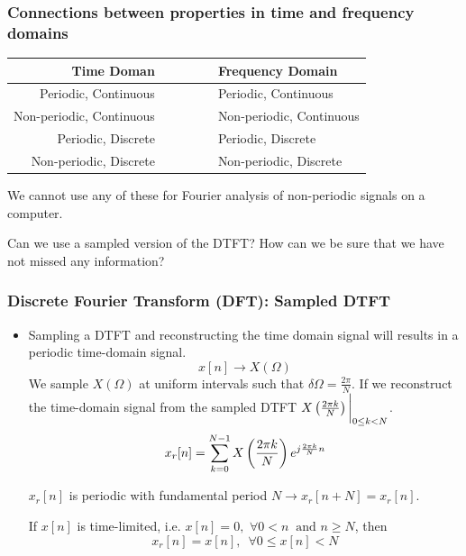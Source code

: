 \documentclass[aspectratio=169]{beamer}
\let\olditem\item
\renewcommand{\item}{\setlength{\itemsep}{\fill}\olditem}
\def\lp{\ensuremath\left(}
\def\rp{\ensuremath\right)}
\begin{document}
\begin{frame}[t]
  \frametitle{Connections between properties in time and frequency domains}

  \begin{table}[]
  \begin{tabular}{rcl}
  \textbf{Time Doman}      & $\quad \quad \quad$ & \textbf{Frequency Domain}\\
  \hline
  Periodic, Continuous     & $\quad \quad \quad$ & Periodic, Continuous     \\
  Non-periodic, Continuous & $\quad \quad \quad$ & Non-periodic, Continuous \\
  Periodic, Discrete       & $\quad \quad \quad$ & Periodic, Discrete       \\
  Non-periodic, Discrete   & $\quad \quad \quad$ & Non-periodic, Discrete   \\
  \end{tabular}
  \end{table}
  \vspace{1cm}

  We cannot use any of these for Fourier analysis of non-periodic signals on a computer.
  \vspace{1cm}

  Can we use a sampled version of the DTFT? How can we be sure that we have not missed any information?
\end{frame}


\begin{frame}[t]
  \frametitle{Discrete Fourier Transform (DFT): Sampled DTFT}

  \begin{itemize}
    \item Sampling a DTFT and reconstructing the time domain signal will results in a periodic time-domain signal.
    \[ x[n] \longrightarrow X( \Omega ) \]
    We sample $X( \Omega )$ at uniform intervals such that $\delta \Omega = \frac{2 \pi}{N} $. If we reconstruct the time-domain signal from the sampled DTFT $X\lp \frac{2 \pi k}{N} \rp\bigg \vert_{0 \leq k < N}$.
    \[ x_r[n] = \sum_{k=0}^{N-1} X\lp \frac{2 \pi k}{N} \rp e^{j\frac{2 \pi k}{N}n}\]

    $x_r[n]$ is periodic with fundamental period $N \longrightarrow x_r[n + N] = x_r[n]$.
    \vspace{0.5cm}

    If $x[n]$ is time-limited, i.e. $x[n] = 0, \,\, \forall 0 < n \,\,\ \text{and} \,\, n \geq N$, then 
    \[ x_r[n] = x[n], \,\,\, \forall 0 \leq x[n] < N \]
  \end{itemize}
\end{frame}
\end{document}
